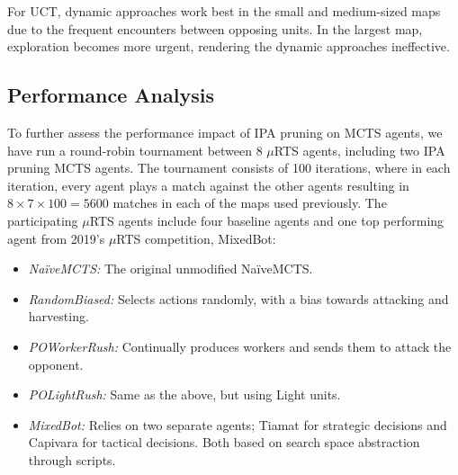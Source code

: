 \documentclass[conference]{IEEEtran}
\newcommand{\mRTS}{$\mu$RTS}
\begin{document}
\begin{table}[!h]
\renewcommand{\arraystretch}{1.3}
\caption{Best Performing Pruning Approaches}
\label{bestApproaches}
\centering
{}
\end{table}

For UCT, dynamic approaches work best in the small and medium-sized maps due to the frequent encounters between opposing units. In the largest map, exploration becomes more urgent, rendering the dynamic approaches ineffective.


\subsection{Performance Analysis}

To further assess the performance impact of IPA pruning on MCTS agents, we have run a round-robin tournament between 8 \mRTS{} agents, including two IPA pruning MCTS agents. The tournament consists of 100 iterations, where in each iteration, every agent plays a match against the other agents resulting in $8\times7\times100 = 5600$ matches in each of the maps used previously. The participating \mRTS{} agents include four baseline agents and one top performing agent from 2019's \mRTS{} competition, MixedBot: %

\begin{itemize}
\item \textit{NaïveMCTS:} The original unmodified NaïveMCTS.
\item \textit{RandomBiased:} Selects actions randomly, with a bias towards attacking and harvesting.
\item \textit{POWorkerRush:} Continually produces workers and sends them to attack the opponent.
\item \textit{POLightRush:} Same as the above, but using Light units.
\item \textit{MixedBot:} Relies on two separate agents; Tiamat\cite{marino_evolving_2018} for strategic decisions and Capivara\cite{moraes_action_2018} for tactical decisions. Both based on search space abstraction through scripts.
\end{itemize}
\end{document}
